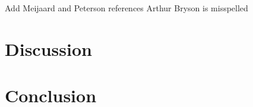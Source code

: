 \documentclass[letterpaper,11pt]{article}
\begin{document}
Add Meijaard and Peterson references
Arthur Bryson is misspelled

\section{Discussion} \label{sec:discussion}

\section{Conclusion} \label{sec:conclusion}

\printbibliography
\end{document}
